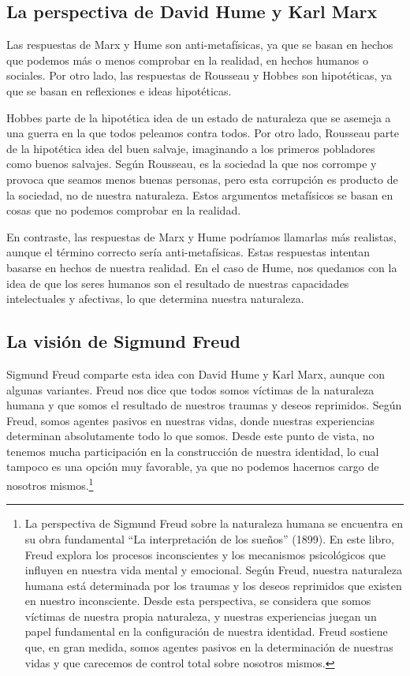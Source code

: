 \documentclass[
  jou,
  floatsintext,
  longtable,
  a4paper,
  nolmodern,
  notxfonts,
  notimes,
  12pt,
  colorlinks=true,linkcolor=blue,citecolor=blue,urlcolor=blue]{apa7}
\begin{document}
\subsection{La perspectiva de David Hume y Karl
Marx}\label{la-perspectiva-de-david-hume-y-karl-marx}

Las respuestas de Marx y Hume son anti-metafísicas, ya que se basan en
hechos que podemos más o menos comprobar en la realidad, en hechos
humanos o sociales. Por otro lado, las respuestas de Rousseau y Hobbes
son hipotéticas, ya que se basan en reflexiones e ideas hipotéticas.

Hobbes parte de la hipotética idea de un estado de naturaleza que se
asemeja a una guerra en la que todos peleamos contra todos. Por otro
lado, Rousseau parte de la hipotética idea del buen salvaje, imaginando
a los primeros pobladores como buenos salvajes. Según Rousseau, es la
sociedad la que nos corrompe y provoca que seamos menos buenas personas,
pero esta corrupción es producto de la sociedad, no de nuestra
naturaleza. Estos argumentos metafísicos se basan en cosas que no
podemos comprobar en la realidad.

En contraste, las respuestas de Marx y Hume podríamos llamarlas más
realistas, aunque el término correcto sería anti-metafísicas. Estas
respuestas intentan basarse en hechos de nuestra realidad. En el caso de
Hume, nos quedamos con la idea de que los seres humanos son el resultado
de nuestras capacidades intelectuales y afectivas, lo que determina
nuestra naturaleza.

\subsection{La visión de Sigmund
Freud}\label{la-visiuxf3n-de-sigmund-freud}

Sigmund Freud comparte esta idea con David Hume y Karl Marx, aunque con
algunas variantes. Freud nos dice que todos somos víctimas de la
naturaleza humana y que somos el resultado de nuestros traumas y deseos
reprimidos. Según Freud, somos agentes pasivos en nuestras vidas, donde
nuestras experiencias determinan absolutamente todo lo que somos. Desde
este punto de vista, no tenemos mucha participación en la construcción
de nuestra identidad, lo cual tampoco es una opción muy favorable, ya
que no podemos hacernos cargo de nosotros mismos.\footnote{La
  perspectiva de Sigmund Freud sobre la naturaleza humana se encuentra
  en su obra fundamental ``La interpretación de los sueños'' (1899). En
  este libro, Freud explora los procesos inconscientes y los mecanismos
  psicológicos que influyen en nuestra vida mental y emocional. Según
  Freud, nuestra naturaleza humana está determinada por los traumas y
  los deseos reprimidos que existen en nuestro inconsciente. Desde esta
  perspectiva, se considera que somos víctimas de nuestra propia
  naturaleza, y nuestras experiencias juegan un papel fundamental en la
  configuración de nuestra identidad. Freud sostiene que, en gran
  medida, somos agentes pasivos en la determinación de nuestras vidas y
  que carecemos de control total sobre nosotros mismos.}
\end{document}
